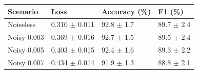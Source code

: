\begin{tabular}{llll}
\toprule
Scenario & Loss & Accuracy (\%) & F1 (\%) \\
\midrule
Noiseless & 0.310 $\pm$ 0.011 & 92.8 $\pm$ 1.7 & 89.7 $\pm$ 2.4 \\
Noisy 0.003 & 0.369 $\pm$ 0.016 & 92.7 $\pm$ 1.5 & 89.5 $\pm$ 2.4 \\
Noisy 0.005 & 0.403 $\pm$ 0.015 & 92.4 $\pm$ 1.6 & 89.3 $\pm$ 2.2 \\
Noisy 0.007 & 0.434 $\pm$ 0.014 & 91.9 $\pm$ 1.3 & 88.8 $\pm$ 2.1 \\
\bottomrule
\end{tabular}
